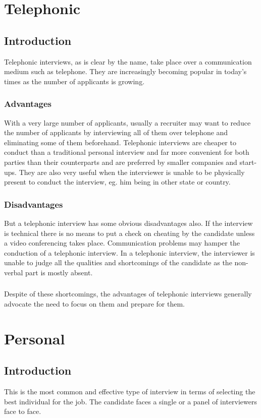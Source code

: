 \documentclass[a4paper,12pt]{report}
\begin{document}
\section{Telephonic}     %
\subsection{Introduction}  %
Telephonic interviews,  as is clear by the name, take place over a communication medium such as telephone.
They are increasingly becoming popular in today's times as the number of applicants is growing.
\subsubsection{Advantages}
With a very large number of applicants, usually a recruiter may want to reduce the number of applicants by interviewing all of them over telephone and eliminating
some of them beforehand. Telephonic interviews are cheaper to conduct than a traditional personal interview and far more convenient
for both parties than their counterparts and are preferred by smaller companies and start-ups. They are also very useful when the interviewer is unable to be physically
present to conduct the interview, eg. him being in other state or country.
\subsubsection{Disadvantages}
But a telephonic interview has some obvious disadvantages also. If the interview is technical there is no
means to put a check on cheating by the candidate unless a video conferencing takes place. Communication problems
may hamper the conduction of a telephonic interview. In a telephonic interview, the interviewer is unable to
judge all the qualities and shortcomings of the candidate as the non-verbal part is mostly absent.
\subsubsection{}
Despite of these shortcomings, the advantages of telephonic interviews generally advocate the need to focus
on them and prepare for them.
\section{Personal}         %
\subsection{Introduction}  %
This is the most common and effective type of interview in terms of selecting the best individual for the job.
The candidate faces a single or a panel of interviewers face to face. 
\end{document}
